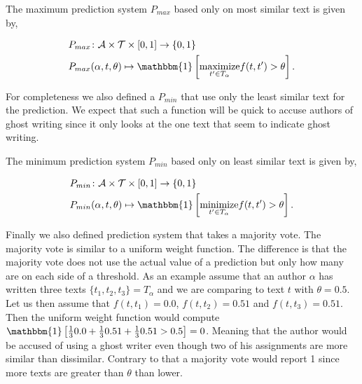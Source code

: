 \begin{definition}
    \label{def:maximum_prediction_system}

    The maximum prediction system $P_{max}$ based only on most similar text is
    given by,

    \begin{align}
        &P_{max} \colon \mathcal{A} \times \mathcal{T} \times [0, 1] \rightarrow
            \{0, 1\} \\
        &P_{max}(\alpha, t, \theta) \mapsto \mathbbm{1}\left[
                \underset{t' \in T_\alpha}{\text{maximize}} f(t, t') > \theta
            \right].
    \end{align}

\end{definition}

For completeness we also defined a $P_{min}$ that use only the least similar
text for the prediction. We expect that such a function will be quick to accuse
authors of ghost writing since it only looks at the one text that seem to
indicate ghost writing.

\begin{definition}
    \label{def:minimum_prediction_system}

    The minimum prediction system $P_{min}$ based only on least similar text is
    given by,

    \begin{align}
        &P_{min} \colon \mathcal{A} \times \mathcal{T} \times [0, 1] \rightarrow
            \{0, 1\} \\
        &P_{min}(\alpha, t, \theta) \mapsto \mathbbm{1}\left[
                \underset{t' \in T_\alpha}{\text{minimize}} f(t, t') > \theta
            \right].
    \end{align}

\end{definition}

Finally we also defined prediction system that takes a majority vote. The
majority vote is similar to a uniform weight function. The difference is that
the majority vote does not use the actual value of a prediction but only how
many are on each side of a threshold. As an example assume that an author
$\alpha$ has written three texts $\{t_1, t_2, t_3\} = T_\alpha$ and we are
comparing to text $t$ with $\theta = 0.5$. Let us then assume that $f(t, t_1) =
0.0$, $f(t, t_2) = 0.51$ and $f(t, t_3) = 0.51$. Then the uniform weight
function would compute $\mathbbm{1} \left[ \frac{1}{3} 0.0 + \frac{1}{3} 0.51 +
\frac{1}{3} 0.51 > 0.5 \right] = 0$. Meaning that the author would be accused of
using a ghost writer even though two of his assignments are more similar than
dissimilar. Contrary to that a majority vote would report 1 since more
texts are greater than $\theta$ than lower.

